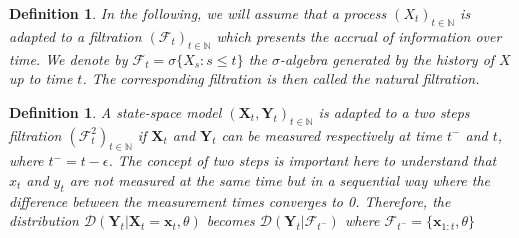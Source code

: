\documentclass[11pt,a4,twosided,singlespacing,titlepagenumber=on]{scrreprt}
\numberwithin{equation}{chapter} %
\newtheorem{definition}[theorem]{Definition}%
\theoremstyle{remark}
\newcommand{\matr}[1]{\mathbf{#1}}
\begin{document}
\begin{definition}
In the following, we will assume that a process $(X_t)_{t \in \mathbb{N}}$ is adapted to a filtration $(\mathcal{F}_t)_{t \in \mathbb{N}}$ which presents the accrual of information over time. We denote by $\mathcal{F}_t = \sigma \{X_s : s \leq t \}$ the $\sigma$-algebra generated by the history of $X$ up to time $t$. The corresponding filtration is then called the natural filtration.
\end{definition}

\begin{definition}
A state-space model $(\matr{X}_t, \matr{Y}_t)_{t \in \mathbb{N}}$ is adapted to a two steps filtration $(\mathcal{F}^2_t)_{t \in \mathbb{N}}$ if $\matr{X}_t$ and $\matr{Y}_t$ can be measured respectively at time $t^-$ and $t$, where $t^- = t - \epsilon$. The concept of two steps is important here to understand that $x_t$ and $y_t$ are not measured at the same time but in a sequential way where the difference between the measurement times converges to 0. Therefore, the distribution $\mathcal{D}(\matr{Y}_t | \matr{X}_t = \matr{x}_t, \theta)$ becomes $\mathcal{D}(\matr{Y}_t | \mathcal{F}_{t^-})$ where $\mathcal{F}_{t^-} = \{\matr{x}_{1:t}, \theta \}$
\end{definition}
\end{document}
